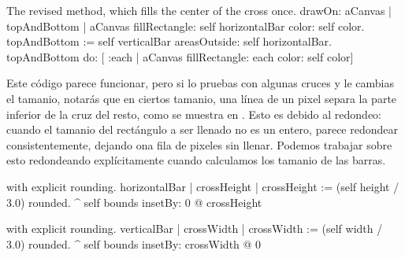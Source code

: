 \documentclass[a4paper,10pt,twoside]{book}
\begin{document}
\begin{method}{The revised  method, which fills the center of the cross once.}
drawOn: aCanvas 
	| topAndBottom |
	aCanvas fillRectangle: self horizontalBar color: self color.
	topAndBottom := self verticalBar areasOutside: self horizontalBar. 
	topAndBottom do: [ :each | aCanvas fillRectangle: each color: self color]
\end{method}

Este c\'odigo parece funcionar, pero si lo pruebas con algunas cruces y le cambias el tamanio, notar\'as que en ciertos tamanio, una l\'inea de un pixel separa la parte inferior de la cruz del resto, como se muestra en .
Esto es debido al redondeo: cuando el tamanio del rect\'angulo a ser llenado no es un entero, 
parece redondear consistentemente, dejando ona fila de pixeles sin llenar.
Podemos trabajar sobre esto redondeando expl\'icitamente cuando calculamos los tamanio de las barras.

\begin{method}{ with explicit rounding.}
horizontalBar
	| crossHeight |
	crossHeight := (self height / 3.0) rounded.
	^ self bounds insetBy: 0 @ crossHeight
\end{method}

\begin{method}{ with explicit rounding.}
verticalBar
	| crossWidth |
	crossWidth := (self width / 3.0) rounded.
	^ self bounds insetBy: crossWidth @ 0
\end{method}






\end{document}
